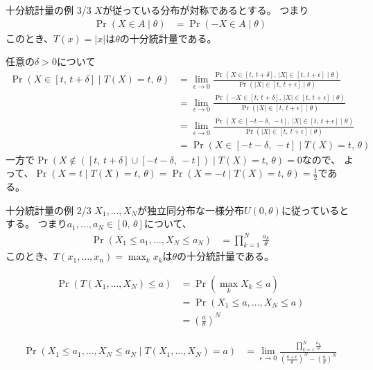 \documentclass[lualatex,handout]{beamer}
\theoremstyle{definition}
\begin{document}
\begin{frame}{十分統計量の例 3/3}
\small
$X$が従っている分布が対称であるとする。
つまり
\begin{align*}
\Pr(X\in A\mid\theta) &= \Pr(-X\in A\mid\theta)
\end{align*}
このとき、$T(x)=|x|$は$\theta$の十分統計量である。

任意の$\delta >0$について
\begin{align*}
\Pr(X\in [t,\,t+\delta]\mid T(X) = t,\,\theta)
 &= \lim_{\epsilon\to0} \frac{\Pr(X\in [t,\,t+\delta],\, |X|\in[t,\,t+\epsilon]\mid\theta)}{\Pr(|X|\in[t,\,t+\epsilon]\mid\theta)}\\
 &= \lim_{\epsilon\to0} \frac{\Pr(-X\in [t,\,t+\delta],\, |X|\in[t,\,t+\epsilon]\mid\theta)}{\Pr(|X|\in[t,\,t+\epsilon]\mid\theta)}\\
 &= \lim_{\epsilon\to0} \frac{\Pr(X\in [-t-\delta,\,-t],\, |X|\in[t,\,t+\epsilon]\mid\theta)}{\Pr(|X|\in[t,\,t+\epsilon]\mid\theta)}\\
 &= \Pr(X\in [-t-\delta,\,-t]\mid T(X) = t,\,\theta)
\end{align*}
一方で$\Pr(X\notin ([t,\,t+\delta] \cup [-t-\delta,\,-t])\mid T(X)=t,\,\theta)=0$なので、
よって、$\Pr(X=t\mid T(X)=t,\,\theta)=\Pr(X=-t\mid T(X)=t,\,\theta)=\frac12$である。
\end{frame}

\begin{frame}{十分統計量の例 2/3}
$X_1,\dotsc,X_N$が独立同分布な一様分布$U(0,\theta)$に従っているとする。
つまり$a_1,\dotsc,a_N\in[0,\,\theta]$について、
\begin{align*}
\Pr(X_1\le a_1,\dotsc, X_N\le a_N)&= \prod_{k=1}^N\frac{a_k}{\theta}
\end{align*}
このとき、$T(x_1,\dotsc,x_n) = \max_k x_k$は$\theta$の十分統計量である。

\begin{align*}
\Pr(T(X_1,\dotsc,X_N)\le a)&= \Pr(\max_k X_k\le a)\\
&= \Pr(X_1\le a,\dotsc, X_N\le a)\\
&= \left(\frac{a}{\theta}\right)^N
\end{align*}

\begin{align*}
\Pr(X_1\le a_1,\dotsc, X_N\le a_N\mid T(X_1,\dotsc,X_N)=a)&= \lim_{\epsilon\to0}\frac{\prod_{k=1}^N\frac{a_k}{\theta}}
{\left(\frac{a+\epsilon}{\theta}\right)^N-\left(\frac{a}{\theta}\right)^N}
\end{align*}
\end{frame}
\fi
\end{document}
